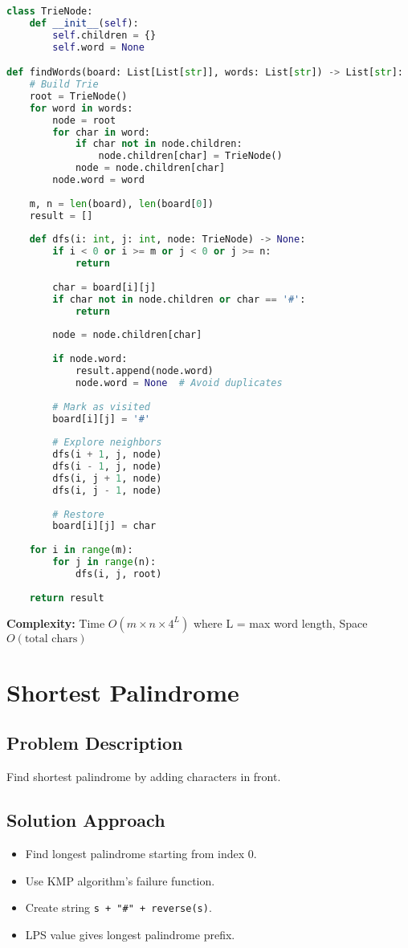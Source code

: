 \documentclass[10pt, a4paper]{article}
\begin{document}
\begin{lstlisting}[language=Python]
class TrieNode:
    def __init__(self):
        self.children = {}
        self.word = None

def findWords(board: List[List[str]], words: List[str]) -> List[str]:
    # Build Trie
    root = TrieNode()
    for word in words:
        node = root
        for char in word:
            if char not in node.children:
                node.children[char] = TrieNode()
            node = node.children[char]
        node.word = word
    
    m, n = len(board), len(board[0])
    result = []
    
    def dfs(i: int, j: int, node: TrieNode) -> None:
        if i < 0 or i >= m or j < 0 or j >= n:
            return
        
        char = board[i][j]
        if char not in node.children or char == '#':
            return
        
        node = node.children[char]
        
        if node.word:
            result.append(node.word)
            node.word = None  # Avoid duplicates
        
        # Mark as visited
        board[i][j] = '#'
        
        # Explore neighbors
        dfs(i + 1, j, node)
        dfs(i - 1, j, node)
        dfs(i, j + 1, node)
        dfs(i, j - 1, node)
        
        # Restore
        board[i][j] = char
    
    for i in range(m):
        for j in range(n):
            dfs(i, j, root)
    
    return result
\end{lstlisting}
\textbf{Complexity:} Time $O(m \times n \times 4^L)$ where L = max word length, Space $O(\text{total chars})$

\section{Shortest Palindrome}
\subsection*{Problem Description}
Find shortest palindrome by adding characters in front.

\subsection*{Solution Approach}
\begin{itemize}
    \item Find longest palindrome starting from index 0.
    \item Use KMP algorithm's failure function.
    \item Create string \texttt{s + "\#" + reverse(s)}.
    \item LPS value gives longest palindrome prefix.
\end{itemize}
\end{document}

